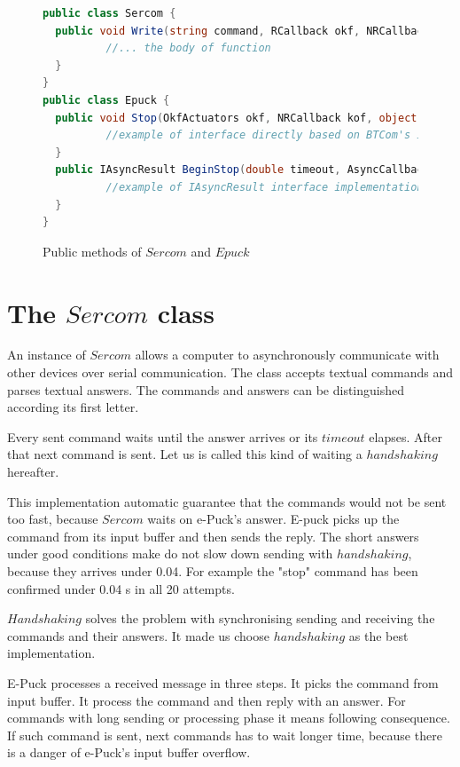\begin{figure}[!hbp]
\begin{lstlisting}[language=cs]
public class Sercom {
  public void Write(string command, RCallback okf, NRCallback kof,object state, double timeout) {
          //... the body of function
  }
}
public class Epuck {
  public void Stop(OkfActuators okf, NRCallback kof, object state, double timeout) {
          //example of interface directly based on BTCom's interface
  }
  public IAsyncResult BeginStop(double timeout, AsyncCallback callback, Object state) {
          //example of IAsyncResult interface implementation
  }
}
\end{lstlisting}
\caption{Public methods of $Sercom$ and $Epuck$} \label{serep}
\end{figure}
\section{The $Sercom$ class}\label{sec:sercom}
  An instance of $Sercom$ allows a computer to asynchronously communicate with other devices
  over serial communication. The class accepts textual commands and parses textual answers.
  The commands and answers can be distinguished according its first letter.
  
  Every sent command waits until the answer arrives or its $timeout$ elapses.
  After that next command is sent. Let us is called this kind of waiting a $handshaking$ hereafter.

  This implementation automatic guarantee that the commands would not be sent too fast,
  because $Sercom$ waits on e-Puck's answer. E-puck picks up the command from its input buffer and then sends the reply.
  The short answers under good conditions make do not slow down sending with $handshaking$, because
  they arrives under 0.04. For example the "stop" command has been confirmed under 0.04 s in all 20 attempts.

  $Handshaking$ solves the problem with synchronising sending and receiving the commands and their answers. 
  It made us choose $handshaking$ as the best implementation.

  E-Puck processes a received message in three steps. It picks the command from input buffer.
  It process the command and then reply with an answer.
  For commands with long sending or processing phase it means following consequence.
  If such command is sent, next commands has to wait longer time, because there is a
  danger of e-Puck's input buffer overflow.

